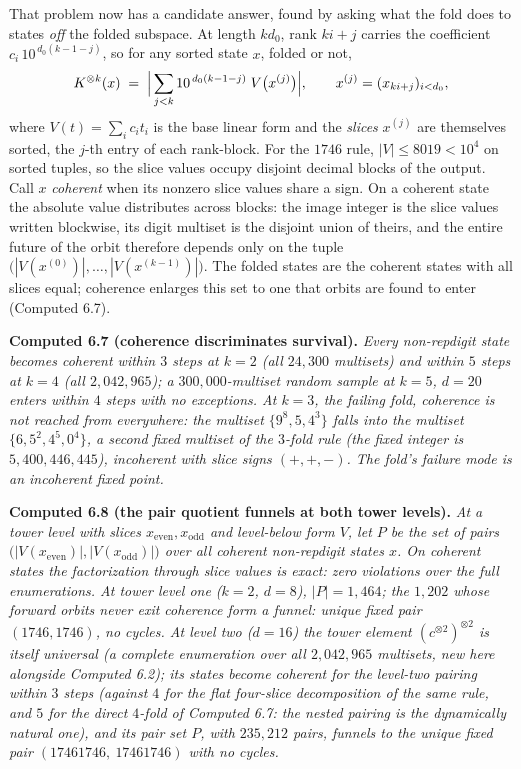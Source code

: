 \documentclass[11pt,letterpaper]{article}
\theoremstyle{paperstyle}
\theoremstyle{paperstyledef}
\theoremstyle{paperstylerem}
\begin{document}
That problem now has a candidate answer, found by asking what the fold does to states \emph{off} the folded subspace. At length \(kd_0\), rank \(ki + j\) carries the coefficient \(c_i\,10^{\,d_0(k-1-j)}\), so for any sorted state \(x\), folded or not, \[K^{\otimes k}(x) \;=\; \Bigl|\, \sum_{j < k} 10^{\,d_0(k-1-j)}\; V\bigl(x^{(j)}\bigr) \Bigr|, \qquad x^{(j)} = (x_{ki+j})_{i < d_0},\] where \(V(t) = \sum_i c_i t_i\) is the base linear form and the \emph{slices} \(x^{(j)}\) are themselves sorted, the \(j\)-th entry of each rank-block. For the \(1746\) rule, \(|V| \leq 8019 < 10^{4}\) on sorted tuples, so the slice values occupy disjoint decimal blocks of the output. Call \(x\) \emph{coherent} when its nonzero slice values share a sign. On a coherent state the absolute value distributes across blocks: the image integer is the slice values written blockwise, its digit multiset is the disjoint union of theirs, and the entire future of the orbit therefore depends only on the tuple \(\bigl(|V(x^{(0)})|, \dots, |V(x^{(k-1)})|\bigr)\). The folded states are the coherent states with all slices equal; coherence enlarges this set to one that orbits are found to enter (Computed 6.7).

\textbf{Computed 6.7 (coherence discriminates survival).} \emph{Every non-repdigit state becomes coherent within \(3\) steps at \(k = 2\) (all \(24{,}300\) multisets) and within \(5\) steps at \(k = 4\) (all \(2{,}042{,}965\)); a \(300{,}000\)-multiset random sample at \(k = 5\), \(d = 20\) enters within \(4\) steps with no exceptions. At \(k = 3\), the failing fold, coherence is not reached from everywhere: the multiset \(\{9^8, 5, 4^3\}\) falls into the multiset \(\{6, 5^2, 4^5, 0^4\}\), a second fixed multiset of the \(3\)-fold rule (the fixed integer is \(5{,}400{,}446{,}445\)), incoherent with slice signs \((+, +, -)\). The fold's failure mode is an incoherent fixed point.}

\textbf{Computed 6.8 (the pair quotient funnels at both tower levels).} \emph{At a tower level with slices \(x_{\mathrm{even}}, x_{\mathrm{odd}}\) and level-below form \(V\), let \(P\) be the set of pairs \(\bigl(|V(x_{\mathrm{even}})|, |V(x_{\mathrm{odd}})|\bigr)\) over all coherent non-repdigit states \(x\). On coherent states the factorization through slice values is exact: zero violations over the full enumerations. At tower level one (\(k = 2\), \(d = 8\)), \(|P| = 1{,}464\); the \(1{,}202\) whose forward orbits never exit coherence form a funnel: unique fixed pair \((1746, 1746)\), no cycles. At level two (\(d = 16\)) the tower element \((c^{\otimes 2})^{\otimes 2}\) is itself universal (a complete enumeration over all \(2{,}042{,}965\) multisets, new here alongside Computed 6.2); its states become coherent for the level-two pairing within \(3\) steps (against \(4\) for the flat four-slice decomposition of the same rule, and \(5\) for the direct \(4\)-fold of Computed 6.7: the nested pairing is the dynamically natural one), and its pair set \(P\), with \(235{,}212\) pairs, funnels to the unique fixed pair \((17461746,\ 17461746)\) with no cycles.}
\end{document}
